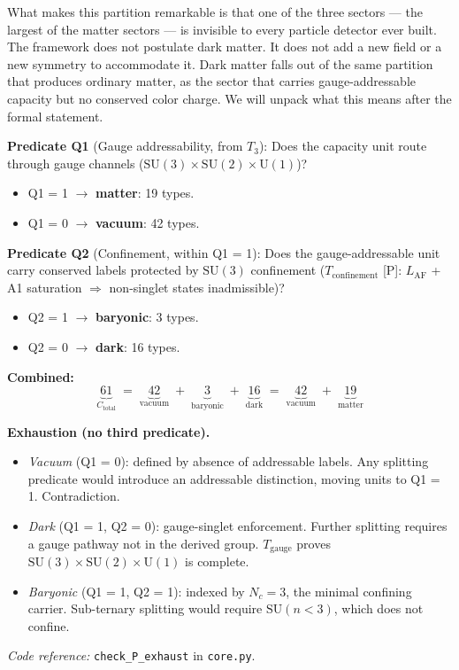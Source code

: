 \documentclass[11pt]{article}
\newenvironment{varlist}{\begin{itemize}[nosep,leftmargin=2em]}{\end{itemize}}
\newcommand{\coderef}[2]{\smallskip\noindent\textit{Code reference:} \texttt{#1} in \texttt{#2}.}
\newcommand{\SU}{\mathrm{SU}}
\newcommand{\U}{\mathrm{U}}
\begin{document}
What makes this partition remarkable is that one of the three sectors --- the largest of the matter sectors --- is invisible to every particle detector ever built.  The framework does not postulate dark matter.  It does not add a new field or a new symmetry to accommodate it.  Dark matter falls out of the same partition that produces ordinary matter, as the sector that carries gauge-addressable capacity but no conserved color charge.  We will unpack what this means after the formal statement.

\begin{tcolorbox}[apfbox, title={$P_{\mathrm{exhaust}}$ (Predicate Exhaustion --- MECE Partition)}]
\textbf{Predicate Q1} (Gauge addressability, from $T_3$): Does the capacity unit route through gauge channels ($\SU(3) \times \SU(2) \times \U(1)$)?
\begin{varlist}
\item Q1 = 1 $\to$ \textbf{matter}: 19 types.
\item Q1 = 0 $\to$ \textbf{vacuum}: 42 types.
\end{varlist}

\smallskip\noindent\textbf{Predicate Q2} (Confinement, within Q1 = 1): Does the gauge-addressable unit carry conserved labels protected by $\SU(3)$ confinement ($T_{\mathrm{confinement}}$ [P]: $L_{\mathrm{AF}}$ + A1 saturation $\Rightarrow$ non-singlet states inadmissible)?
\begin{varlist}
\item Q2 = 1 $\to$ \textbf{baryonic}: 3 types.
\item Q2 = 0 $\to$ \textbf{dark}: 16 types.
\end{varlist}

\smallskip\noindent\textbf{Combined:}
\begin{equation}
\underbrace{61}_{C_{\mathrm{total}}} \;=\; \underbrace{42}_{\text{vacuum}} \;+\; \underbrace{3}_{\text{baryonic}} \;+\; \underbrace{16}_{\text{dark}} \;=\; \underbrace{42}_{\text{vacuum}} \;+\; \underbrace{19}_{\text{matter}}
\label{eq:mece_partition}
\end{equation}

\smallskip\noindent\textbf{Exhaustion (no third predicate).}
\begin{varlist}
\item \textit{Vacuum} (Q1 = 0): defined by absence of addressable labels.  Any splitting predicate would introduce an addressable distinction, moving units to Q1 = 1.  Contradiction.
\item \textit{Dark} (Q1 = 1, Q2 = 0): gauge-singlet enforcement.  Further splitting requires a gauge pathway not in the derived group.  $T_{\mathrm{gauge}}$ proves $\SU(3) \times \SU(2) \times \U(1)$ is complete.
\item \textit{Baryonic} (Q1 = 1, Q2 = 1): indexed by $N_c = 3$, the minimal confining carrier.  Sub-ternary splitting would require $\SU(n < 3)$, which does not confine.
\end{varlist}

\coderef{check\_P\_exhaust}{core.py}
\end{tcolorbox}
\end{document}
